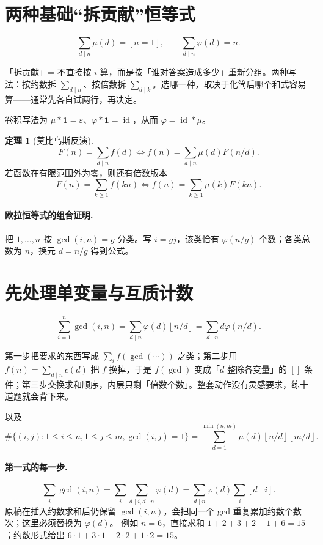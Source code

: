 \documentclass[UTF8,a4paper,11pt,twoside,openright,fontset=fandol]{ctexbook}
\theoremstyle{definition}
\newtheorem{theorem}[definition]{定理}
\newcommand{\eps}{\varepsilon}
\newcommand{\one}{\mathbf 1}
\newcommand{\id}{\operatorname{id}}
\newcommand{\floor}[1]{\left\lfloor #1\right\rfloor}
\newcommand{\iva}[1]{\left[#1\right]}
\begin{document}
\section{两种基础“拆贡献”恒等式}
\[
\sum_{d\mid n}\mu(d)=[n=1],\qquad
\sum_{d\mid n}\varphi(d)=n.
\]

\begin{tip}[词义：拆贡献]
「拆贡献」= 不直接按 $i$ 算，而是按「谁对答案造成多少」重新分组。两种写法：按约数拆 $\sum_{d\mid n}$、按倍数拆 $\sum_{d\mid k}$。选哪一种，取决于化简后哪个和式容易算——通常先各自试两行，再决定。
\end{tip}

卷积写法为 $\mu*\one=\eps$、$\varphi*\one=\id$，从而 $\varphi=\id*\mu$。
\begin{theorem}[莫比乌斯反演]
\[
 F(n)=\sum_{d\mid n}f(d)
 \iff f(n)=\sum_{d\mid n}\mu(d)F(n/d).
\]
若函数在有限范围外为零，则还有倍数版本
\[
 F(n)=\sum_{k\ge1}f(kn)
 \iff f(n)=\sum_{k\ge1}\mu(k)F(kn).
\]
\end{theorem}

\paragraph{欧拉恒等式的组合证明.}
把 $1,\ldots,n$ 按 $\gcd(i,n)=g$ 分类。写 $i=gj$，该类恰有 $\varphi(n/g)$ 个数；各类总数为 $n$，换元 $d=n/g$ 得到公式。
\section{先处理单变量与互质计数}
\[
 \sum_{i=1}^n\gcd(i,n)
 =\sum_{d\mid n}\varphi(d)\floor{n/d}
 =\sum_{d\mid n}d\varphi(n/d).
\]

\begin{tip}
第一步把要求的东西写成 $\sum_{i}f(\gcd(\cdots))$ 之类；第二步用 $f(n)=\sum_{d\mid n}c(d)$ 把 $f$ 换掉，于是 $f(\gcd)$ 变成「$d$ 整除各变量」的 $\iva{}$ 条件；第三步交换求和顺序，内层只剩「倍数个数」。整套动作没有灵感要求，练十道题就会背下来。
\end{tip}

以及
\[
 \#\{(i,j):1\le i\le n,1\le j\le m,\gcd(i,j)=1\}
 =\sum_{d=1}^{\min(n,m)}\mu(d)\floor{n/d}\floor{m/d}.
\]

\paragraph{第一式的每一步.}
\[
\sum_i\gcd(i,n)
=\sum_i\sum_{d\mid i,d\mid n}\varphi(d)
=\sum_{d\mid n}\varphi(d)\sum_i[d\mid i].
\]
原稿在插入约数求和后仍保留 $\gcd(i,n)$，会把同一个 gcd 重复累加约数个数次；这里必须替换为 $\varphi(d)$。
例如 $n=6$，直接求和 $1+2+3+2+1+6=15$；约数形式给出 $6\cdot1+3\cdot1+2\cdot2+1\cdot2=15$。
\end{document}
